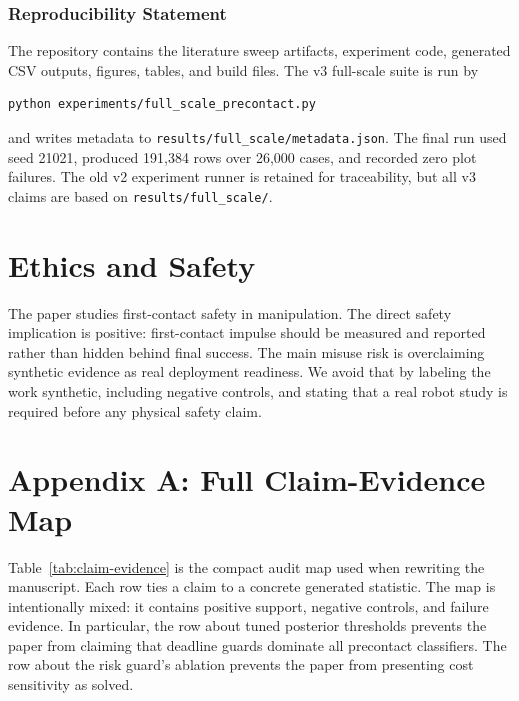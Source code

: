 \documentclass{article}
\begin{document}
\subsubsection*{Reproducibility Statement}
The repository contains the literature sweep artifacts, experiment code, generated CSV outputs, figures, tables, and build files. The v3 full-scale suite is run by
\begin{verbatim}
python experiments/full_scale_precontact.py
\end{verbatim}
and writes metadata to \texttt{results/full\_scale/metadata.json}. The final run used seed 21021, produced 191,384 rows over 26,000 cases, and recorded zero plot failures. The old v2 experiment runner is retained for traceability, but all v3 claims are based on \texttt{results/full\_scale/}.

\section*{Ethics and Safety}

The paper studies first-contact safety in manipulation. The direct safety implication is positive: first-contact impulse should be measured and reported rather than hidden behind final success. The main misuse risk is overclaiming synthetic evidence as real deployment readiness. We avoid that by labeling the work synthetic, including negative controls, and stating that a real robot study is required before any physical safety claim.




\appendix

\section{Appendix A: Full Claim-Evidence Map}



Table~\ref{tab:claim-evidence} is the compact audit map used when rewriting the manuscript. Each row ties a claim to a concrete generated statistic. The map is intentionally mixed: it contains positive support, negative controls, and failure evidence. In particular, the row about tuned posterior thresholds prevents the paper from claiming that deadline guards dominate all precontact classifiers. The row about the risk guard's ablation prevents the paper from presenting cost sensitivity as solved.
\end{document}

